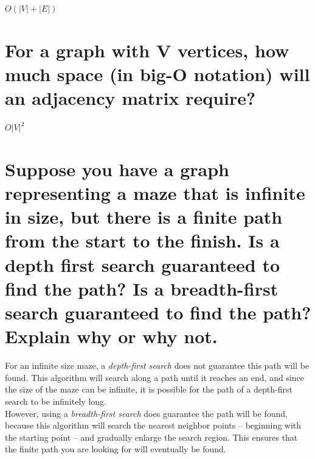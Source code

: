 \documentclass[letter,11pt]{scrartcl}
\providecommand{\abs}[1]{\lvert#1\rvert}
\begin{document}
$O (\abs{V} + \abs{E})$


\section[question_10]{For a graph with V vertices, how much space (in big-O
  notation) will an adjacency matrix require?}

$O \abs{V}^2$


\section[question_11]{Suppose you have a graph representing a maze that is
  infinite in size, but there is a finite path from the start to the
  finish. Is a depth first search guaranteed to find the path? Is a
  breadth-first search guaranteed to find the path? Explain why or why not.}

For an infinite size maze, a \emph{depth-first search} does not guarantee this
path will be found. This algorithm will search along a path until it reaches
an end, and since the size of the maze can be infinite, it is possible for the
path of a depth-first search to be infinitely long. \\

However, using a \emph{breadth-first search} does guarantee the path will be
found, because this algorithm will search the nearest neighbor points --
beginning with the starting point -- and gradually enlarge the search
region. This ensures that the finite path you are looking for will eventually
be found.

\end{document}
